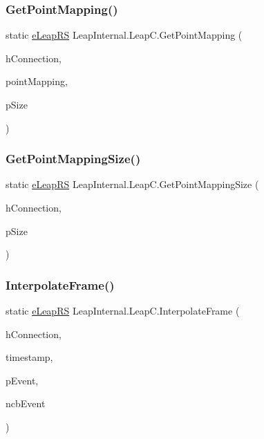 \mbox{\label{class_leap_internal_1_1_leap_c_a39052bbaaa77cce6bf489a8cdc57d12a}} 
\subsubsection{\texorpdfstring{GetPointMapping()}{GetPointMapping()}}
{\footnotesize\ttfamily static \mbox{\hyperlink{namespace_leap_internal_ae50b07d24c508b84273392b6dcbea1d9}{e\+Leap\+RS}} Leap\+Internal.\+Leap\+C.\+Get\+Point\+Mapping (\begin{DoxyParamCaption}\item[{Int\+Ptr}]{h\+Connection,  }\item[{Int\+Ptr}]{point\+Mapping,  }\item[{ref ulong}]{p\+Size }\end{DoxyParamCaption})}

\mbox{\label{class_leap_internal_1_1_leap_c_a4daa8c0a407f4137fa9ee27bdda02adb}} 
\subsubsection{\texorpdfstring{GetPointMappingSize()}{GetPointMappingSize()}}
{\footnotesize\ttfamily static \mbox{\hyperlink{namespace_leap_internal_ae50b07d24c508b84273392b6dcbea1d9}{e\+Leap\+RS}} Leap\+Internal.\+Leap\+C.\+Get\+Point\+Mapping\+Size (\begin{DoxyParamCaption}\item[{Int\+Ptr}]{h\+Connection,  }\item[{ref ulong}]{p\+Size }\end{DoxyParamCaption})}

\mbox{\label{class_leap_internal_1_1_leap_c_a37b93d6d332a4fb88714b1a7583c3ce8}} 
\subsubsection{\texorpdfstring{InterpolateFrame()}{InterpolateFrame()}}
{\footnotesize\ttfamily static \mbox{\hyperlink{namespace_leap_internal_ae50b07d24c508b84273392b6dcbea1d9}{e\+Leap\+RS}} Leap\+Internal.\+Leap\+C.\+Interpolate\+Frame (\begin{DoxyParamCaption}\item[{Int\+Ptr}]{h\+Connection,  }\item[{Int64}]{timestamp,  }\item[{Int\+Ptr}]{p\+Event,  }\item[{U\+Int64}]{ncb\+Event }\end{DoxyParamCaption})}

